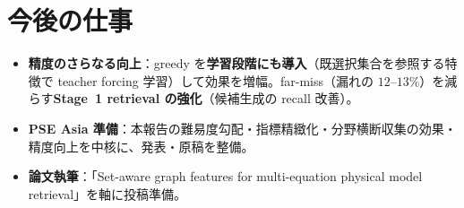\documentclass[11pt,a4paper]{ltjsarticle}
\begin{document}
\section{今後の仕事}
\begin{itemize}[leftmargin=1.5em]
  \item \textbf{精度のさらなる向上}：greedy を\textbf{学習段階にも導入}（既選択集合を参照する特徴で teacher forcing 学習）して効果を増幅。far-miss（漏れの $12$--$13\%$）を減らす\textbf{Stage~1 retrieval の強化}（候補生成の recall 改善）。
  \item \textbf{PSE Asia 準備}：本報告の難易度勾配・指標精緻化・分野横断収集の効果・精度向上を中核に、発表・原稿を整備。
  \item \textbf{論文執筆}：「Set-aware graph features for multi-equation physical model retrieval」を軸に投稿準備。
\end{itemize}
\end{document}
